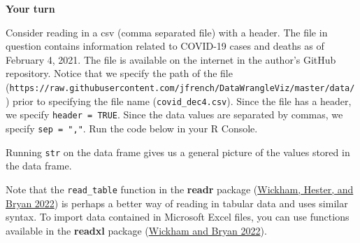 \documentclass[
]{book}
\newenvironment{Shaded}{\begin{snugshade}}{\end{snugshade}}
\newcommand{\AttributeTok}[1]{\textcolor[rgb]{0.77,0.63,0.00}{#1}}
\newcommand{\CommentTok}[1]{\textcolor[rgb]{0.56,0.35,0.01}{\textit{#1}}}
\newcommand{\ConstantTok}[1]{\textcolor[rgb]{0.00,0.00,0.00}{#1}}
\newcommand{\DocumentationTok}[1]{\textcolor[rgb]{0.56,0.35,0.01}{\textbf{\textit{#1}}}}
\newcommand{\FunctionTok}[1]{\textcolor[rgb]{0.00,0.00,0.00}{#1}}
\newcommand{\NormalTok}[1]{#1}
\newcommand{\OtherTok}[1]{\textcolor[rgb]{0.56,0.35,0.01}{#1}}
\newcommand{\StringTok}[1]{\textcolor[rgb]{0.31,0.60,0.02}{#1}}
\theoremstyle{definition}
\theoremstyle{definition}
\theoremstyle{definition}
\theoremstyle{definition}
\theoremstyle{remark}
\begin{document}
\begin{yourturn}
\textbf{Your turn}

Consider reading in a csv (comma separated file) with a header. The file in question contains information related to COVID-19 cases and deaths as of February 4, 2021. The file is available on the internet in the author's GitHub repository. Notice that we specify the path of the file (\texttt{https://raw.githubusercontent.com/jfrench/DataWrangleViz/master/data/}) prior to specifying the file name (\texttt{covid\_dec4.csv}). Since the file has a header, we specify \texttt{header\ =\ TRUE}. Since the data values are separated by commas, we specify \texttt{sep\ =\ ","}. Run the code below in your R Console.

\begin{Shaded}
\end{Shaded}

Running \texttt{str} on the data frame gives us a general picture of the values stored in the data frame.

\end{yourturn}

Note that the \texttt{read\_table} function in the \textbf{readr} package (\protect\hyperlink{ref-R-readr}{Wickham, Hester, and Bryan 2022}) is perhaps a better way of reading in tabular data and uses similar syntax. To import data contained in Microsoft Excel files, you can use functions available in the \textbf{readxl} package (\protect\hyperlink{ref-R-readxl}{Wickham and Bryan 2022}).
\end{document}
